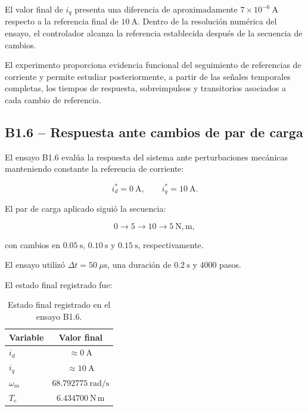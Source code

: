 El valor final de \(i_q\) presenta una diferencia de aproximadamente \(7\times10^{-6}~\mathrm{A}\) respecto a la referencia final de \(10~\mathrm{A}\). Dentro de la resolución numérica del ensayo, el controlador alcanza la referencia establecida después de la secuencia de cambios.

El experimento proporciona evidencia funcional del seguimiento de referencias de corriente y permite estudiar posteriormente, a partir de las señales temporales completas, los tiempos de respuesta, sobreimpulsos y transitorios asociados a cada cambio de referencia.

\subsection{B1.6 -- Respuesta ante cambios de par de carga}

El ensayo B1.6 evalúa la respuesta del sistema ante perturbaciones mecánicas manteniendo constante la referencia de corriente:

\begin{equation}
i_d^*=0~\mathrm{A},
\qquad
i_q^*=10~\mathrm{A}.
\end{equation}

El par de carga aplicado siguió la secuencia:

\begin{equation}
0
\rightarrow
5
\rightarrow
10
\rightarrow
5~\mathrm{N,m},
\end{equation}

con cambios en \(0.05~\mathrm{s}\), \(0.10~\mathrm{s}\) y \(0.15~\mathrm{s}\), respectivamente.

El ensayo utilizó \(\Delta t=50~\mu\mathrm{s}\), una duración de \(0.2~\mathrm{s}\) y \(4000\) pasos.

El estado final registrado fue:

\begin{table}[H]
\centering
\caption{Estado final registrado en el ensayo B1.6.}
\label{tab:b1_6_resultado}
\begin{tabular}{lc}
\toprule
\textbf{Variable} & \textbf{Valor final} \\
\midrule
\(i_d\) & \(\approx0~\mathrm{A}\) \\
\(i_q\) & \(\approx10~\mathrm{A}\) \\
\(\omega_m\) & \(68.792775~\mathrm{rad/s}\) \\
\(T_e\) & \(6.434700~\mathrm{N\,m}\) \\
\bottomrule
\end{tabular}
\end{table}


